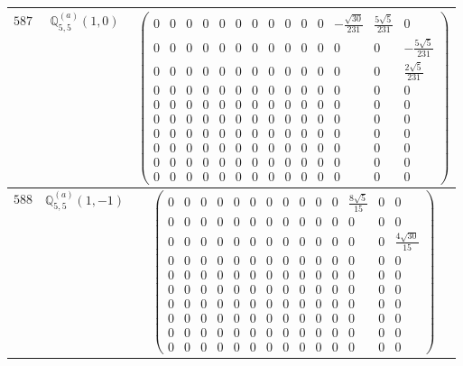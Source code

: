 \documentclass[fleqn,8pt,landscape]{jsarticle}
\begin{document}
\begin{center}
\begin{longtable}{ccc}
$ 587 $ & $ \mathbb{Q}_{5,5}^{(a)}(1,0) $ & $ \begin{pmatrix} 0 & 0 & 0 & 0 & 0 & 0 & 0 & 0 & 0 & 0 & 0 & - \frac{\sqrt{30}}{231} & \frac{5 \sqrt{5}}{231} & 0 \\ 0 & 0 & 0 & 0 & 0 & 0 & 0 & 0 & 0 & 0 & 0 & 0 & 0 & - \frac{5 \sqrt{5}}{231} \\ 0 & 0 & 0 & 0 & 0 & 0 & 0 & 0 & 0 & 0 & 0 & 0 & 0 & \frac{2 \sqrt{5}}{231} \\ 0 & 0 & 0 & 0 & 0 & 0 & 0 & 0 & 0 & 0 & 0 & 0 & 0 & 0 \\ 0 & 0 & 0 & 0 & 0 & 0 & 0 & 0 & 0 & 0 & 0 & 0 & 0 & 0 \\ 0 & 0 & 0 & 0 & 0 & 0 & 0 & 0 & 0 & 0 & 0 & 0 & 0 & 0 \\ 0 & 0 & 0 & 0 & 0 & 0 & 0 & 0 & 0 & 0 & 0 & 0 & 0 & 0 \\ 0 & 0 & 0 & 0 & 0 & 0 & 0 & 0 & 0 & 0 & 0 & 0 & 0 & 0 \\ 0 & 0 & 0 & 0 & 0 & 0 & 0 & 0 & 0 & 0 & 0 & 0 & 0 & 0 \\ 0 & 0 & 0 & 0 & 0 & 0 & 0 & 0 & 0 & 0 & 0 & 0 & 0 & 0 \end{pmatrix} $ \\ \hline
$ 588 $ & $ \mathbb{Q}_{5,5}^{(a)}(1,-1) $ & $ \begin{pmatrix} 0 & 0 & 0 & 0 & 0 & 0 & 0 & 0 & 0 & 0 & 0 & \frac{8 \sqrt{5}}{15} & 0 & 0 \\ 0 & 0 & 0 & 0 & 0 & 0 & 0 & 0 & 0 & 0 & 0 & 0 & 0 & 0 \\ 0 & 0 & 0 & 0 & 0 & 0 & 0 & 0 & 0 & 0 & 0 & 0 & 0 & \frac{4 \sqrt{30}}{15} \\ 0 & 0 & 0 & 0 & 0 & 0 & 0 & 0 & 0 & 0 & 0 & 0 & 0 & 0 \\ 0 & 0 & 0 & 0 & 0 & 0 & 0 & 0 & 0 & 0 & 0 & 0 & 0 & 0 \\ 0 & 0 & 0 & 0 & 0 & 0 & 0 & 0 & 0 & 0 & 0 & 0 & 0 & 0 \\ 0 & 0 & 0 & 0 & 0 & 0 & 0 & 0 & 0 & 0 & 0 & 0 & 0 & 0 \\ 0 & 0 & 0 & 0 & 0 & 0 & 0 & 0 & 0 & 0 & 0 & 0 & 0 & 0 \\ 0 & 0 & 0 & 0 & 0 & 0 & 0 & 0 & 0 & 0 & 0 & 0 & 0 & 0 \\ 0 & 0 & 0 & 0 & 0 & 0 & 0 & 0 & 0 & 0 & 0 & 0 & 0 & 0 \end{pmatrix} $ \\ \hline

\end{longtable}
\end{center}
\end{document}
